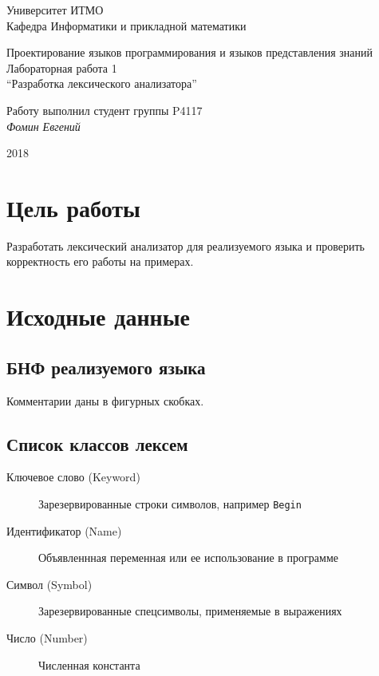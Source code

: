 \documentclass[12pt, a4paper]{article}
\begin{document}
\thispagestyle{empty}
\begin{center}
  {\large
    Университет ИТМО \\
    Кафедра Информатики и прикладной математики \\
  }
\end{center}
\begin{center}
  {\large
    Проектирование языков программирования и языков представления знаний\\
  }
  {\large
    Лабораторная работа 1\\
    ``Разработка лексического анализатора''\\
  }

\end{center}
\begin{flushright}
  Работу выполнил студент группы P4117\\
  {\it Фомин Евгений\\}
\end{flushright}
\begin{center}
  2018
\end{center}
\newpage

\section{Цель работы}
Разработать лексический анализатор для реализуемого языка и
проверить корректность его работы на примерах.

\section{Исходные данные}
\subsection{БНФ реализуемого языка}


Комментарии даны в фигурных скобках.

\subsection{Список классов лексем}
\begin{description}
\item[Ключевое слово (Keyword)] Зарезервированные строки символов, например \texttt{Begin}
\item[Идентификатор (Name)] Объявленнная переменная или ее использование в программе
\item[Символ (Symbol)] Зарезервированные спецсимволы, применяемые в выражениях
\item[Число (Number)] Численная константа

\end{description}
\end{document}
